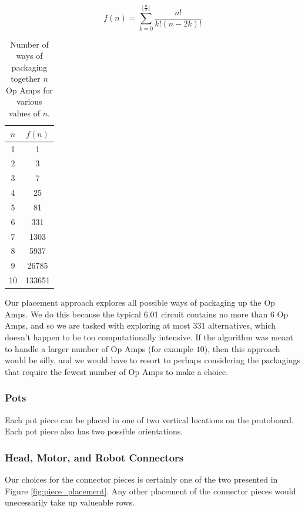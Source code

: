 \begin{equation}
f(n) = \sum\limits_{k=0}^{\lfloor\frac{n}{2}\rfloor}{\frac{n!}{k!(n - 2k)!}}
\label{eq:opamp}
\end{equation}

\begin{table}
\begin{center}
\begin{singlespace}
\begin{tabular}{c | c}
$n$ & $f(n)$ \\
\hline
\hline
1 & 1 \\
2 & 3 \\
3 & 7 \\
4 & 25 \\
5 & 81 \\
6 & 331 \\
7 & 1303 \\
8 & 5937 \\
9 & 26785 \\
10 & 133651
\end{tabular}
\end{singlespace}
\end{center}
\label{tb:opamp}
\caption{Number of ways of packaging together $n$ Op Amps for various values of
$n$.}
\end{table}

Our placement approach explores all possible ways
of packaging up the Op Amps. We do this because the typical 6.01 circuit contains
no more than $6$ Op Amps, and so we are tasked with exploring at most $331$
alternatives, which doesn't happen to be too computationally intensive. If the
algorithm was meant to handle a larger number of Op Amps (for example $10$), then
this approach would be silly, and we would have to resort to perhaps considering
the packagings that require the fewest number of Op Amps to make a choice.

\subsubsection{Pots}

Each pot piece can be placed in one of two vertical locations on the protoboard.
Each pot piece also has two possible orientations.

\subsubsection{Head, Motor, and Robot Connectors}

Our choices for the connector pieces is certainly one of the two presented in
Figure \ref{fig:piece_placement}. Any other placement of the connector pieces
would unecessarily take up valueable rows.

